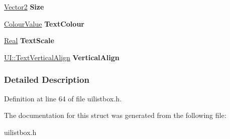 \begin{DoxyCompactItemize}
\item 
\hypertarget{structMezzanine_1_1UI_1_1ListBox_1_1TemplateParams_a8578c613779b24fbe7d4f6ee3d4c6974}{
\hyperlink{classMezzanine_1_1Vector2}{Vector2} {\bfseries Size}}
\label{structMezzanine_1_1UI_1_1ListBox_1_1TemplateParams_a8578c613779b24fbe7d4f6ee3d4c6974}

\item 
\hypertarget{structMezzanine_1_1UI_1_1ListBox_1_1TemplateParams_a0a79e4552df9d69b6b842bb308afd20a}{
\hyperlink{classMezzanine_1_1ColourValue}{ColourValue} {\bfseries TextColour}}
\label{structMezzanine_1_1UI_1_1ListBox_1_1TemplateParams_a0a79e4552df9d69b6b842bb308afd20a}

\item 
\hypertarget{structMezzanine_1_1UI_1_1ListBox_1_1TemplateParams_a17a640bf4f80b53f4a3c40e699c41a90}{
\hyperlink{namespaceMezzanine_a726731b1a7df72bf3583e4a97282c6f6}{Real} {\bfseries TextScale}}
\label{structMezzanine_1_1UI_1_1ListBox_1_1TemplateParams_a17a640bf4f80b53f4a3c40e699c41a90}

\item 
\hypertarget{structMezzanine_1_1UI_1_1ListBox_1_1TemplateParams_aeb56321925f3ff0d3f9ced7310203bf6}{
\hyperlink{namespaceMezzanine_1_1UI_ab35e3845e2541698245262cc17147ae9}{UI::TextVerticalAlign} {\bfseries VerticalAlign}}
\label{structMezzanine_1_1UI_1_1ListBox_1_1TemplateParams_aeb56321925f3ff0d3f9ced7310203bf6}

\end{DoxyCompactItemize}


\subsubsection{Detailed Description}


Definition at line 64 of file uilistbox.h.



The documentation for this struct was generated from the following file:\begin{DoxyCompactItemize}
\item 
uilistbox.h\end{DoxyCompactItemize}
